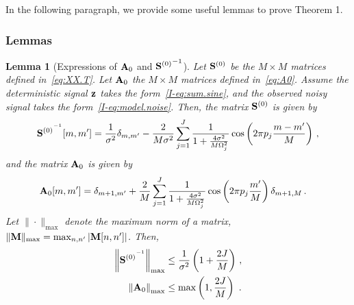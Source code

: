 \documentclass[journal,onecolumn]{IEEEtran}
\newtheorem{lemma}{Lemma}
\begin{document}
In the following paragraph, we provide some useful lemmas to prove Theorem 1.

\subsubsection{Lemmas}

\begin{lemma}[Expressions of ${\mathbf A}_0$ and ${{\mathbf S}^{(0)}}^{-1}$]
Let ${\mathbf S}^{(0)}$ be the $M\times M$ matrices defined in~\eqref{eq:XX.T}. Let ${\mathbf A}_0$ the $M\times M$ matrices defined in~\eqref{eq:A0}. Assume the deterministic signal ${\mathbf z}$ takes the form~\eqref{I-eq:sum.sine}, and the observed noisy signal takes the form~\eqref{I-eq:model.noise}. Then, the matrix ${\mathbf S}^{(0)}$ is given by
\begin{equation}
{\bS^{(0)}}^\inv[m,m']  = \dfrac1{\sigma^2}\delta_{m,m'}-\dfrac{2}{M\sigma^2}\sum_{j=1}^J\dfrac{1}{1+\frac{4\sigma^2}{M\Omega_j^2}}\cos\left(2\pi p_j \dfrac{m-m'}{M}\right)\,,
\label{eq:S0.inv}
\end{equation}
and the matrix ${\mathbf A}_0$ is given by
\begin{align}
\bA_0[m,m']  &= \delta_{m+1,m'} + \dfrac2M\sum_{j=1}^J\dfrac{1}{1+\frac{4\sigma^2}{M\Omega_j^2}}\cos\left(2\pi p_j\frac{m'}{M}\right)\delta_{m+1,M}\,.
\label{eq:A0.sine}
\end{align}
Let $\|\cdot\|_{\max}$ denote the maximum norm of a matrix, \ie~$\|{\mathbf M}\|_{\max} = \max_{n,n'} \left|{\mathbf M}[n,n']\right|$. Then,
\begin{align}
\label{eq:S0.inv.bound}
\left\|{\bS^{(0)}}^\inv\right\|_{\max} &\leq \dfrac1{\sigma^2}\left(1+\frac{2J}{M}\right)\,, \\
\left\|\bA_0\right\|_{\max} &\leq \max\left(1,\frac{2J}{M}\right)\ .
\label{eq:A0.bound}
\end{align}
\end{lemma}
\end{document}

